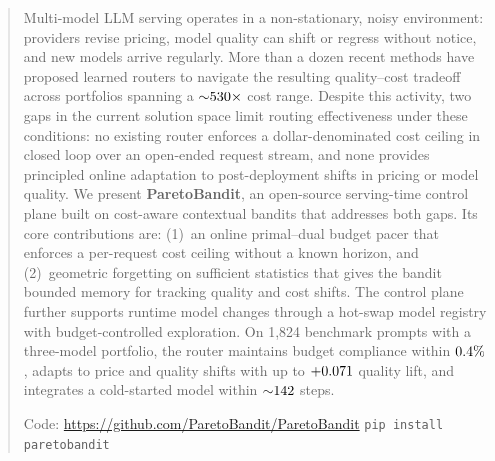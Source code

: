 \begin{abstract}
Multi-model LLM serving operates in a non-stationary, noisy
environment: providers revise pricing, model quality can shift or
regress without notice, and new models arrive regularly. More than a
dozen recent methods have proposed learned routers to navigate the
resulting quality--cost tradeoff across portfolios spanning a
${\sim}\ppPriceRangeX\times$ cost range. Despite this activity, two
gaps in the current solution space limit routing effectiveness under
these conditions: no existing router enforces a dollar-denominated cost
ceiling in closed loop over an open-ended request stream, and none
provides principled online adaptation to post-deployment shifts in
pricing or model quality.
We present \textbf{ParetoBandit}, an open-source serving-time control
plane built on cost-aware contextual bandits that addresses both gaps.
Its core contributions are: (1)~an online primal--dual budget pacer that
enforces a per-request cost ceiling without a known horizon, and
(2)~geometric forgetting on sufficient statistics that gives the bandit
bounded memory for tracking quality and cost shifts. The control plane
further supports runtime model changes through a hot-swap model registry
with budget-controlled exploration.
On 1,824 benchmark prompts with a three-model portfolio, the router
maintains budget compliance within $\ppMaxBudgetOvershootPct\%$, adapts
to price and quality shifts with up to $+\ppMaxQualityLift$ quality
lift, and integrates a cold-started model within
${\sim}\ppAdoptionSteps$ steps.

\vskip 6pt
\noindent\small Code: \url{https://github.com/ParetoBandit/ParetoBandit} \quad\textbar\quad \texttt{pip install paretobandit}
\end{abstract}
